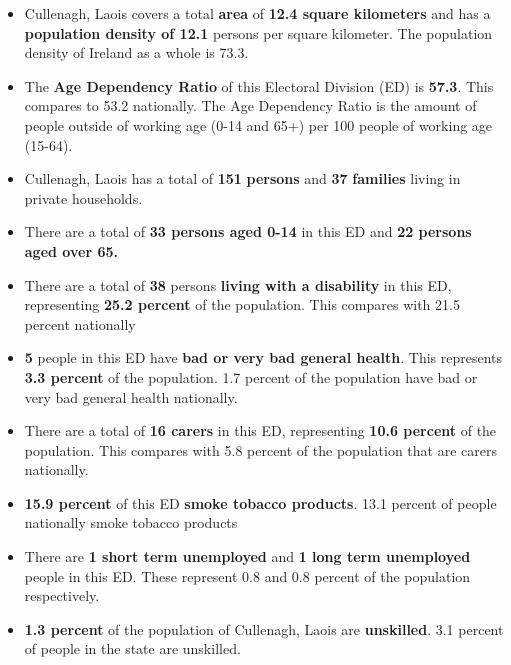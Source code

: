 \documentclass{article}
\begin{document}
\begin{itemize}

\item Cullenagh, Laois covers a total \textbf{area} of  \textbf{12.4 square kilometers} and has a \textbf{population density of 12.1} persons per square kilometer. The population density of Ireland as a whole is  73.3. 

\item The \textbf{Age Dependency Ratio} of this Electoral Division (ED) is  \textbf{57.3}. This compares to 53.2 nationally. The Age Dependency Ratio is the amount of people outside of working age (0-14 and 65+) per 100 people of working age (15-64). 

\item Cullenagh, Laois has a total of \textbf{151} \textbf{persons} and  \textbf{37} \textbf{families} living in private households.

\item There are a total of \textbf{33 persons aged 0-14} in this ED and \textbf{22 persons aged over 65.} 

\item There are a total of \textbf{38} persons \textbf{living with a disability} in this ED, representing \textbf{25.2 percent} of the population. This compares with  21.5 percent nationally

\item \textbf{5} people in this ED have \textbf{bad or very bad general health}. This represents \textbf{3.3 percent} of the population. 1.7 percent of the population have bad or very bad general health nationally. 

\item There are a total of \textbf{16 carers} in this ED, representing \textbf{10.6 percent} of the population. This compares with 5.8 percent of the population that are carers nationally. 

\item \textbf{15.9 percent} of this ED \textbf{smoke tobacco products}. 13.1 percent of people nationally smoke tobacco products

\item There are \textbf{1 short term unemployed} and \textbf{1 long term unemployed} people in this ED. These represent 0.8 and 0.8 percent of the population respectively.

\item  \textbf{1.3 percent} of the population of Cullenagh, Laois are \textbf{unskilled}. 3.1 percent of people in the state are unskilled.


\end{itemize}
\end{document}
